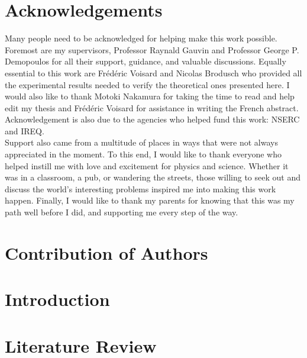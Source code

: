\documentclass[12pt]{report}
\begin{document}
\chapter*{Acknowledgements}
Many people need to be acknowledged for helping make this work possible.  Foremost are my supervisors,  Professor Raynald Gauvin and  Professor George P. Demopoulos for all their support, guidance, and valuable discussions.  Equally essential to this work are Fr\'ed\'eric Voisard and Nicolas Brodusch who provided all the experimental results needed to verify the theoretical ones presented here. I would also like to thank Motoki Nakamura  for taking the time to read and help edit my thesis and Fr\'ed\'eric Voisard for assistance in writing the French abstract. Acknowledgement is also due to the agencies who helped fund this work: NSERC and IREQ.  \\

Support also came from a multitude of places in ways that were not always appreciated in the moment.  To this end, I would like to thank everyone who helped instill me with love and excitement for physics and science.  Whether it was in a classroom, a pub, or wandering the streets, those willing to seek out and discuss the world's interesting problems inspired me into making this work happen. Finally, I would like to thank my parents for knowing that this was my path well before I did, and supporting me every step of the way. 




\chapter*{Contribution of Authors}











\chapter{Introduction}
\renewcommand{\thepage}{\arabic{page}}%
\setcounter{page}{1}%




\chapter{Literature Review}\label{literature_review}

\end{document}
